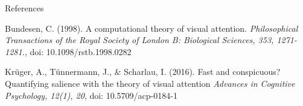 \documentclass[a0paper,portrait]{baposter}
\begin{document}
\begin{poster}
\begin{posterbox}[name=refs,column=0,span=3,below=procedure,above=bottom]{References}
\footnotesize
\linespread{1}

{\color{upbblue}Bundesen, C. } ({\color{upbblue}1998}). A computational theory of visual attention. \textit{Philosophical Transactions of the Royal Society of London B: Biological Sciences, 353, 1271-1281.}, doi: 10.1098/rstb.1998.0282 

{\color{upbblue}Krüger, A., Tünnermann, J., \& Scharlau, I.} ({\color{upbblue}2016}). Fast and conspicuous? Quantifying salience with the theory of visual attention \textit{Advances in Cognitive Psychology, 12(1), 20}, doi: 10.5709/acp-0184-1 
\vspace{0.115cm}
\end{posterbox}

\end{poster}
\end{document}
